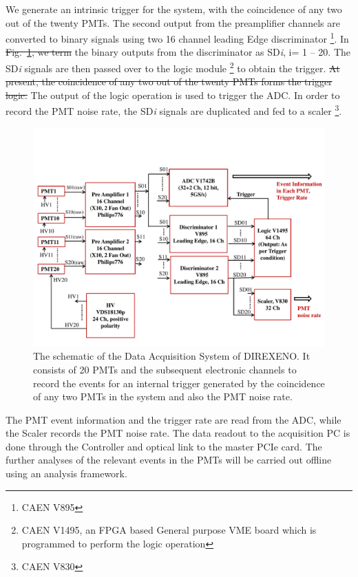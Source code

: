  We generate an intrinsic trigger for the system, with the coincidence of any two out of the twenty PMTs. The second output from the preamplifier channels are converted to binary signals using two 16 channel leading Edge discriminator \footnote{CAEN V895}. In \sout{Fig.~\ref{Fig:DAQscheme}, we term} the binary outputs from the discriminator  as SD{\it i}, i= 1 -- 20. The SD{\it i} signals are then passed over to the logic module \footnote{CAEN V1495, an FPGA based General purpose VME board which is programmed to perform the 
logic operation} to obtain the trigger.  \sout{At present, the coincidence of any two out of the twenty PMTs forms the trigger logic.} The output of the logic operation is 
used to trigger the ADC. In order to record the PMT noise rate, the 
SD{\it i} signals are duplicated and fed to a scaler \footnote{CAEN V830}.


\begin{figure}
   \centering
   \includegraphics[width=\textwidth]{DAQscheme.pdf}
   \caption{The schematic of the Data Acquisition System of DIREXENO. It 
        consists of 20 PMTs and the subsequent electronic channels to record 
        the events for an internal trigger generated by the coincidence of any 
        two PMTs in the system and also the PMT noise rate.}
   \label{Fig:DAQscheme}
\end{figure}

The PMT event information and the trigger rate are read from the ADC, while the Scaler records the PMT noise rate. The data readout to the acquisition PC is done through the Controller and optical link to the master PCIe card. The further analyses of the relevant events in the PMTs will be carried out offline using an analysis framework.





\clearpage %